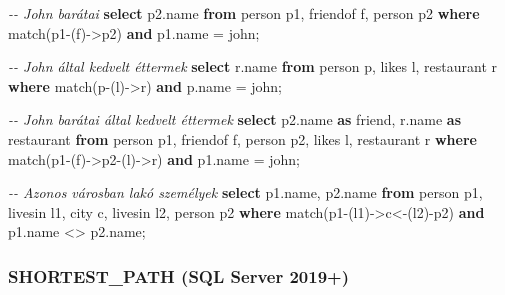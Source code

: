 \documentclass[
  magyar,
]{article}
\newenvironment{Shaded}{}{}
\newcommand{\CommentTok}[1]{\textcolor[rgb]{0.38,0.63,0.69}{\textit{#1}}}
\newcommand{\KeywordTok}[1]{\textcolor[rgb]{0.00,0.44,0.13}{\textbf{#1}}}
\newcommand{\NormalTok}[1]{#1}
\newcommand{\OperatorTok}[1]{\textcolor[rgb]{0.40,0.40,0.40}{#1}}
\newcommand{\StringTok}[1]{\textcolor[rgb]{0.25,0.44,0.63}{#1}}
\begin{document}
\begin{Shaded}
\begin{Highlighting}[]
\CommentTok{{-}{-} John barátai}
\KeywordTok{select}\NormalTok{ p2.name}
\KeywordTok{from}\NormalTok{ person p1, friendof f, person p2}
\KeywordTok{where}\NormalTok{ match(p1}\OperatorTok{{-}}\NormalTok{(f)}\OperatorTok{{-}\textgreater{}}\NormalTok{p2)}
\KeywordTok{and}\NormalTok{ p1.name }\OperatorTok{=} \StringTok{\textquotesingle{}john\textquotesingle{}}\NormalTok{;}

\CommentTok{{-}{-} John által kedvelt éttermek}
\KeywordTok{select}\NormalTok{ r.name}
\KeywordTok{from}\NormalTok{ person p, likes l, restaurant r}
\KeywordTok{where}\NormalTok{ match(p}\OperatorTok{{-}}\NormalTok{(l)}\OperatorTok{{-}\textgreater{}}\NormalTok{r)}
\KeywordTok{and}\NormalTok{ p.name }\OperatorTok{=} \StringTok{\textquotesingle{}john\textquotesingle{}}\NormalTok{;}

\CommentTok{{-}{-} John barátai által kedvelt éttermek}
\KeywordTok{select}\NormalTok{ p2.name }\KeywordTok{as}\NormalTok{ friend, r.name }\KeywordTok{as}\NormalTok{ restaurant}
\KeywordTok{from}\NormalTok{ person p1, friendof f, person p2, likes l, restaurant r}
\KeywordTok{where}\NormalTok{ match(p1}\OperatorTok{{-}}\NormalTok{(f)}\OperatorTok{{-}\textgreater{}}\NormalTok{p2}\OperatorTok{{-}}\NormalTok{(l)}\OperatorTok{{-}\textgreater{}}\NormalTok{r)}
\KeywordTok{and}\NormalTok{ p1.name }\OperatorTok{=} \StringTok{\textquotesingle{}john\textquotesingle{}}\NormalTok{;}

\CommentTok{{-}{-} Azonos városban lakó személyek}
\KeywordTok{select}\NormalTok{ p1.name, p2.name}
\KeywordTok{from}\NormalTok{ person p1, livesin l1, city c, livesin l2, person p2}
\KeywordTok{where}\NormalTok{ match(p1}\OperatorTok{{-}}\NormalTok{(l1)}\OperatorTok{{-}\textgreater{}}\NormalTok{c}\OperatorTok{\textless{}{-}}\NormalTok{(l2)}\OperatorTok{{-}}\NormalTok{p2)}
\KeywordTok{and}\NormalTok{ p1.name }\OperatorTok{\textless{}\textgreater{}}\NormalTok{ p2.name;}
\end{Highlighting}
\end{Shaded}

\subsubsection{SHORTEST\_PATH (SQL Server
2019+)}\label{shortest_path-sql-server-2019}
\end{document}
